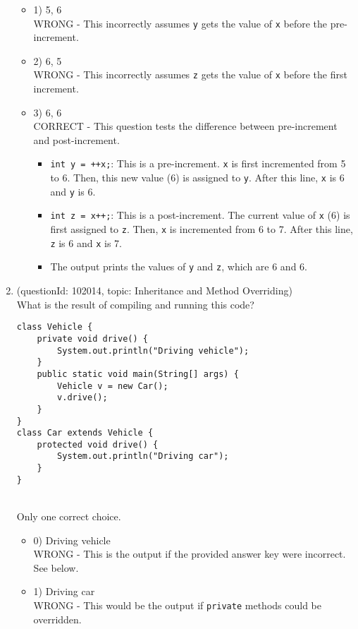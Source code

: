 \documentclass[12pt]{article}
\begin{document}
\begin{enumerate}[label=(\arabic*)]
\begin{itemize}
\item 1) 5, 6
 \\ 
WRONG - This incorrectly assumes \verb|y| gets the value of \verb|x| before the pre-increment.

\item 2) 6, 5
 \\ 
WRONG - This incorrectly assumes \verb|z| gets the value of \verb|x| before the first increment.

\item 3) 6, 6
 \\ 
CORRECT - This question tests the difference between pre-increment and post-increment.
\begin{itemize}
\item \verb|int y = ++x;|: This is a pre-increment. \verb|x| is first incremented from 5 to 6. Then, this new value (6) is assigned to \verb|y|. After this line, \verb|x| is 6 and \verb|y| is 6.
\item \verb|int z = x++;|: This is a post-increment. The current value of \verb|x| (6) is first assigned to \verb|z|. Then, \verb|x| is incremented from 6 to 7. After this line, \verb|z| is 6 and \verb|x| is 7.
\item The output prints the values of \verb|y| and \verb|z|, which are 6 and 6.
\end{itemize}

\end{itemize}
\item (questionId: 102014, topic: Inheritance and Method Overriding) \\ 
What is the result of compiling and running this code?
\begin{verbatim}
class Vehicle {
    private void drive() {
        System.out.println("Driving vehicle");
    }
    public static void main(String[] args) {
        Vehicle v = new Car();
        v.drive();
    }
}
class Car extends Vehicle {
    protected void drive() {
        System.out.println("Driving car");
    }
}
\end{verbatim}
\\ \noindent Only one correct choice. 
\begin{itemize}
\item 0) Driving vehicle
 \\ 
WRONG - This is the output if the provided answer key were incorrect. See below.

\item 1) Driving car
 \\ 
WRONG - This would be the output if \verb|private| methods could be overridden.


\end{itemize}
\end{enumerate}
\end{document}
